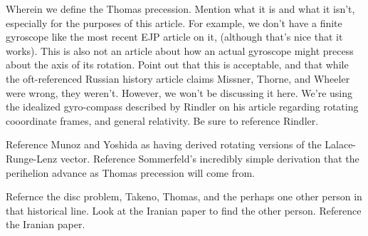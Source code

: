 \documentclass[prb,preprint]{revtex4-1}
\begin{document}
Wherein we define the Thomas precession.  Mention what it is and what it isn't, especially for the purposes of this article.  For example, we don't have a finite gyroscope like the most recent EJP article on it, (although that's nice that it works).  This is also not an article about how an actual gyroscope might precess about the axis of its rotation.  Point out that this is acceptable, and that while the oft-referenced Russian history article claims Missner, Thorne, and Wheeler were wrong, they weren't.  However, we won't be discussing it here.  We're using the idealized gyro-compass described by Rindler on his article regarding rotating cooordinate frames, and general relativity.  Be sure to reference Rindler.

Reference Munoz and Yoshida as having derived rotating versions of the Lalace-Runge-Lenz vector.  Reference Sommerfeld's incredibly simple derivation that the perihelion advance as Thomas precession will come from.  

Refernce the disc problem, Takeno, Thomas, and the perhaps one other person in that historical line.  Look at the Iranian paper to find the other person.  Reference the Iranian paper.
\\
\\
\end{document}
